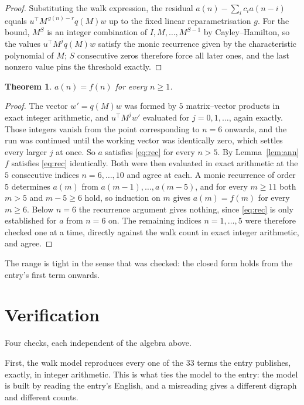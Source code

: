 \documentclass[11pt,a4paper]{article}
\theoremstyle{plain}
\newtheorem{theorem}{Theorem}
\theoremstyle{definition}
\begin{document}
\begin{proof}
Substituting the walk expression, the residual $a(n)-\sum_ic_ia(n-i)$ equals
$u^{\!\top}M^{\,g(n)-r}q(M)w$ up to the fixed linear reparametrisation $g$. For the bound,
$M^{S}$ is an integer combination of $I,M,\dots,M^{S-1}$ by Cayley--Hamilton, so the values
$u^{\!\top}M^{j}q(M)w$ satisfy the monic recurrence given by the characteristic polynomial of
$M$; $S$ consecutive zeros therefore force all later ones, and the last nonzero value pins the
threshold exactly.
\end{proof}

\begin{theorem}
$a(n)=f(n)$ for every $n\ge1$.
\end{theorem}

\begin{proof}
The vector $w'=q(M)w$ was formed by $5$ matrix--vector products in exact integer
arithmetic, and $u^{\!\top}M^{j}w'$ evaluated for $j=0,1,\dots$, again exactly. Those integers
vanish from the point corresponding to $n=6$ onwards, and the run was continued until the
working vector was identically zero, which settles every larger $j$ at once. So $a$ satisfies
\eqref{eq:rec} for every $n>5$. By Lemma~\ref{lem:ann} $f$ satisfies \eqref{eq:rec}
identically. Both were then evaluated in exact arithmetic at the $5$ consecutive indices
$n=6,\dots,10$ and agree at each. A monic recurrence of order $5$
determines $a(m)$ from $a(m-1),\dots,a(m-5)$, and for every $m\ge11$ both
$m>5$ and $m-5\ge6$ hold, so induction on $m$ gives $a(m)=f(m)$ for every
$m\ge6$.
Below $n=6$ the recurrence argument gives nothing, since \eqref{eq:rec} is only
established for $a$ from $n=6$ on. The remaining indices $n=1,\dots,5$ were
therefore checked one at a time, directly against the walk count in exact integer arithmetic,
and agree.
\end{proof}

The range is tight in the sense that was checked: the closed form holds from the entry's first term onwards.

\section{Verification}

Four checks, each independent of the algebra above.

First, the walk model reproduces every one of the $33$ terms the entry publishes,
exactly, in integer arithmetic. This is what ties the model to the entry: the model is built
by reading the entry's English, and a misreading gives a different digraph and different
counts.
\end{document}
